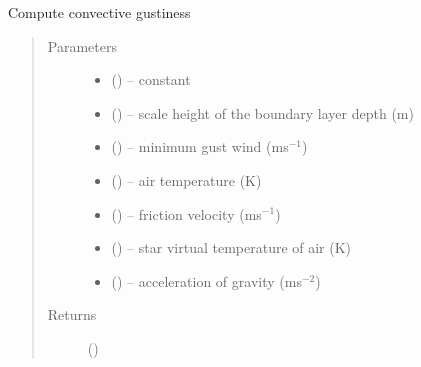 \documentclass[letterpaper,10pt,english]{sphinxmanual}
\begin{document}

\begin{fulllineitems}
\label{\detokenize{index:flux_subs.get_gust}}
Compute convective gustiness
\begin{quote}\begin{description}
\item[{Parameters}] \leavevmode\begin{itemize}
\item {} 
 (\href{https://docs.python.org/3/library/functions.html\#float}{}) -- constant

\item {} 
 (\href{https://docs.python.org/3/library/functions.html\#int}{}) -- scale height of the boundary layer depth (m)

\item {} 
 (\href{https://docs.python.org/3/library/functions.html\#int}{}) -- minimum gust wind (ms$^{-1}$)

\item {} 
 (\href{https://docs.python.org/3/library/functions.html\#float}{}) -- air temperature (K)

\item {} 
 (\href{https://docs.python.org/3/library/functions.html\#float}{}) -- friction velocity (ms$^{-1}$)

\item {} 
 (\href{https://docs.python.org/3/library/functions.html\#float}{}) -- star virtual temperature of air (K)


\item {} 
 (\href{https://docs.python.org/3/library/functions.html\#float}{}) -- acceleration of gravity (ms$^{-2}$)

\end{itemize}

\item[{Returns}] \leavevmode
{} (\href{https://docs.python.org/3/library/functions.html\#float}{})

\end{description}\end{quote}

\end{fulllineitems}
\end{document}
